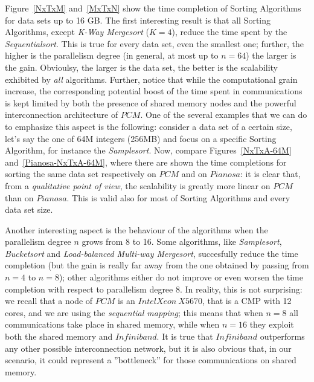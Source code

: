 Figure~\ref{NxTxM} and~\ref{MxTxN} show the time completion of Sorting Algorithms for data sets up to 16 GB. The first interesting result is that all Sorting Algorithms, except \textit{K-Way Mergesort} ($K=4$), reduce the time spent by the \textit{Sequentialsort}. This is true for every data set, even the smallest one; further, the higher is the parallelism degree (in general, at most up to $n=64$) the larger is the gain. Obvioulsy, the larger is the data set, the better is the scalability exhibited by \textit{all} algorithms. Further, notice that while the computational grain increase, the corresponding potential boost of the time spent in communications is kept limited by both the presence of shared memory nodes and the powerful interconnection architecture of $PCM$. One of the several examples that we can do to emphasize this aspect is the following: consider a data set of a certain size, let's say the one of 64M integers (256MB) and focus on a specific Sorting Algorithm, for instance the \textit{Samplesort}. Now, compare Figures~\ref{NxTxA-64M} and~\ref{Pianosa-NxTxA-64M}, where there are shown the time completions for sorting the same data set respectively on $PCM$ and on $Pianosa$: it is clear that, from a \textit{qualitative point of view}, the scalability is greatly more linear on $PCM$ than on $Pianosa$. This is valid also for most of Sorting Algorithms and every data set size. 

Another interesting aspect is the behaviour of the algorithms when the parallelism degree $n$ grows from 8 to 16. Some algorithms, like \textit{Samplesort}, \textit{Bucketsort} and \textit{Load-balanced Multi-way Mergesort}, succesfully reduce the time completion (but the gain is really far away from the one obtained by passing from $n=4$ to $n=8$); other algorithms either do not improve or even worsen the time completion with respect to parallelism degree 8. In reality, this is not surprising: we recall that a node of $PCM$ is an $IntelXeon\ X5670$, that is a CMP with 12 cores, and we are using the \textit{sequential mapping}; this means that when $n=8$ all communications take place in shared memory, while when $n=16$ they exploit both the shared memory and $Infiniband$. It is true that $Infiniband$ outperforms any other possible interconnection network, but it is also obvious that, in our scenario, it could represent a ''bottleneck'' for those communications on shared memory. 



